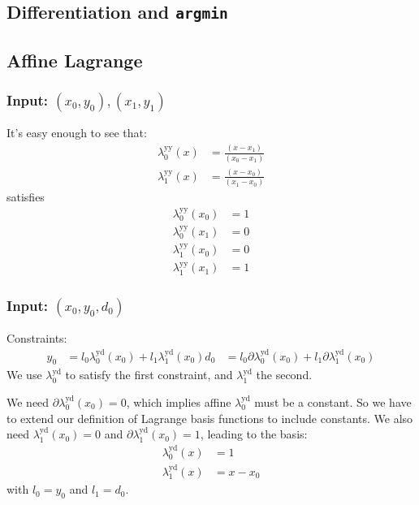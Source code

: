 \subsection{Differentiation and \texttt{argmin}}

\subsection{Affine Lagrange}

\subsubsection{Input: $(x_0,y_0),(x_1,y_1)$}

It's easy enough to see that:
\begin{align}
\lambda^{\text{yy}}_0(x) & = \frac {(x - x_1)} {(x_0 - x_1)} \\
\lambda^{\text{yy}}_1(x) & = \frac {(x - x_0)} {(x_1 - x_0)} \nonumber
\end{align}
satisfies
\begin{align}
\lambda^{\text{yy}}_0(x_0) & = 1 \\
\lambda^{\text{yy}}_0(x_1) & = 0 \nonumber \\
\lambda^{\text{yy}}_1(x_0) & = 0 \nonumber \\
\lambda^{\text{yy}}_1(x_1) & = 1 \nonumber 
\end{align}


\subsubsection{Input: $(x_0,y_0,d_0)$}

Constraints:
\begin{equation}
\begin{aligned}
y_0 & = l_0 \lambda^{\text{yd}}_0 (x_0) + l_1 \lambda^{\text{yd}}_1 (x_0) 
d_0 & = l_0 \partial\lambda^{\text{yd}}_0 (x_0) + l_1 \partial\lambda^{\text{yd}}_1 (x_0) 
\end{aligned}
\end{equation}
We use $\lambda^{\text{yd}}_0$ to satisfy the first constraint,
and $\lambda^{\text{yd}}_1$ the second.

We need $\partial\lambda^{\text{yd}}_0 (x_0) = 0$,
which implies affine $\lambda^{\text{yd}}_0$ 
must be a constant.
So we have to extend our definition of Lagrange basis functions
to include constants.
We also need $\lambda^{\text{yd}}_1 (x_0) = 0$ and
$\partial\lambda^{\text{yd}}_1 (x_0) = 1$, leading to the basis:
\begin{align}
\lambda^{\text{yd}}_0 (x) & = 1 \\
\lambda^{\text{yd}}_1 (x) & = x - x_0 \nonumber
\end{align}
with $l_0 = y_0$ and $l_1 = d_0$.

